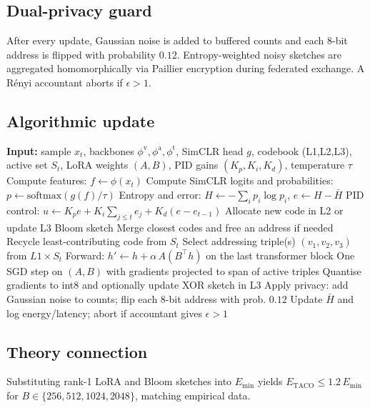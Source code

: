 \documentclass{article}
\begin{document}
\subsection{Dual-privacy guard}
After every update, Gaussian noise is added to buffered counts and each 8-bit address is flipped with probability $0.12$. Entropy-weighted noisy sketches are aggregated homomorphically via Paillier encryption during federated exchange. A R\'enyi accountant aborts if $\epsilon>1$.

\subsection{Algorithmic update}
\begin{algorithm}[t]
\caption{TACO online update per sample}
\begin{algorithmic}[1]
  \State \textbf{Input:} sample $x_t$, backbones $\phi^{\mathrm{v}},\phi^{\mathrm{a}},\phi^{\mathrm{t}}$, SimCLR head $g$, codebook (L1,L2,L3), active set $S_t$, LoRA weights $(A,B)$, PID gains $(K_p,K_i,K_d)$, temperature $\tau$
  \State Compute features: $f\leftarrow \phi(x_t)$
  \State Compute SimCLR logits and probabilities: $p\leftarrow \mathrm{softmax}(g(f)/\tau)$
  \State Entropy and error: $H\leftarrow -\sum_i p_i\log p_i$, $e\leftarrow H-\bar{H}$
  \State PID control: $u\leftarrow K_p e + K_i\sum_{j\le t} e_j + K_d(e-e_{t-1})$
    \State Allocate new code in L2 or update L3 Bloom sketch
    \State Merge closest codes and free an address if needed
    \State Recycle least-contributing code from $S_t$
  \EndIf
  \State Select addressing triple(s) $(v_1,v_2,v_3)$ from $L1\times S_t$
  \State Forward: $h'\leftarrow h+\alpha\,A(B^{\top}h)$ on the last transformer block
  \State One SGD step on $(A,B)$ with gradients projected to span of active triples
  \State Quantise gradients to int8 and optionally update XOR sketch in L3
  \State Apply privacy: add Gaussian noise to counts; flip each 8-bit address with prob. $0.12$
  \State Update $\bar{H}$ and log energy/latency; abort if accountant gives $\epsilon>1$
\end{algorithmic}
\end{algorithm}

\subsection{Theory connection}
Substituting rank-1 LoRA and Bloom sketches into $E_{\min}$ yields $E_{\mathrm{TACO}} \leq 1.2\,E_{\min}$ for $B\in\{256,512,1024,2048\}$, matching empirical data.
\end{document}

